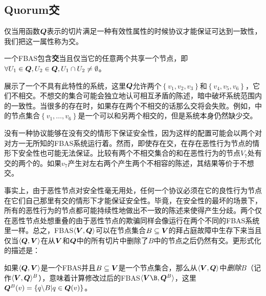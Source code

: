 \subsection{Quorum交}

仅当用函数${\bm Q}$表示的{\quorum}切片满足一种有效性属性的时候协议才能保证可达到一致性，我们把这一属性称为{\quorum}交。

\begin{definition}[{\quorum}交]
	一个FBAS包含\textbf{{\quorum}交}当且仅当它的任意两个{\quorum}共享一个节点，即$\forall U_1\in{\bm Q},U_2\in{\bm Q},U_1\cap U_2\neq\emptyset$。
\end{definition}

展示了一个不具有此特性的系统，这里${\bm Q}$允许两个{\quorum}$\left\{v_1,v_2,v_3\right\}$和$\left\{v_4,v_5,v_6\right\}$，它们不相交。不想交的集合可能会独立地认可相互矛盾的陈述，暗中破坏系统范围内的一致性。当很多的{\quorum}存在时，如果存在两个不相交的话那么{\quorum}交将会失败。例如，中的节点集合$\left\{v_1,\ldots ,v_6\right\}$是一个可以和另两个{\quorum}相交的{\quorum}，但是系统本身仍然缺少{\quorum}交。

没有一种协议能够在没有{\quorum}交的情形下保证安全性，因为这样的配置可能会以两个对对方一无所知的FBAS系统运行着。然而，即使存在{\quorum}交，在存在恶性行为节点的情形下安全性也可能无法保证。比较有两个不相交集合的和在恶性行为的节点$V_7$处有交的两个{\quorum}的。如果$v_7$产生对左右两个{\quorum}产生两个不相容的陈述，其结果等价于不想交{\quorum}。

事实上，由于恶性节点对安全性毫无用处，任何一个协议必须在它的良性行为节点在它们自己那里有{\quorum}交的情形下才能保证安全性。毕竟，在安全性的最坏的场景下，所有的恶性行为的节点都可能持续性地做出不一致的陈述来使得{\quorum}产生分歧。两个仅在恶性节点处想重叠的{\quorum}由于恶性节点的欺骗同样会像运行在两个不同的FBAS系统里一样。总之，FBAS$\langle {\bm V},{\bm Q}\rangle$可以在节点集合$B\subseteq {\bm V}$的拜占庭故障中生存下来当且仅当$\langle{\bm Q},{\bm V}\rangle$在从${\bm V}$和${\bm Q}$中的所有切片中删除了$B$中的节点之后仍然有{\quorum}交。更形式化的描述是：

\begin{definition}[删除]
	如果$\langle{\bm Q},{\bm V}\rangle$是一个FBAS并且$B\subseteq {\bm V}$是一个节点集合，那么从$\langle{\bm V},{\bm Q}\rangle$中\textit{删除}$B$（记作$\langle{\bm V},{\bm Q}\rangle^B$），意味着计算修改过后的FBAS$\langle\mybm{V}\B, \mybm{Q}^B\rangle$，这里${\bm Q}^B(v)=\left\{q\backslash B|q\in{\bm Q(v)}\right\}$。
\end{definition}

